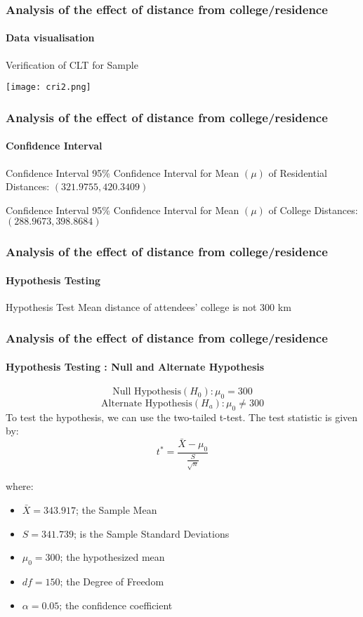 \documentclass{beamer}
\begin{document}
\begin{frame}
\frametitle{Analysis of the effect of distance
from college/residence}
\framesubtitle{Data visualisation}
Verification of CLT for Sample\\
\vspace{5mm}
\begin{minipage}{\textwidth}
    \centering
    \texttt{[image: cri2.png]}
    \label{fig:enter-label}
\end{minipage}
\end{frame}

\begin{frame}
\frametitle{Analysis of the effect of distance
from college/residence}
\framesubtitle{Confidence Interval}
\begin{block}{Confidence Interval}
95\% Confidence Interval for Mean $(\mu)$ of Residential Distances: $(321.9755, 420.3409)$
\end{block}
\begin{block}{Confidence Interval}
95\% Confidence Interval for Mean $(\mu)$ of College Distances: $(288.9673, 398.8684)$
\end{block}
\end{frame}

\begin{frame}
\frametitle{Analysis of the effect of distance
from college/residence}
\framesubtitle{Hypothesis Testing}
\begin{block}{Hypothesis Test}
Mean distance of attendees’ college is not $300$ km
\end{block}
\end{frame}

\begin{frame}
\frametitle{Analysis of the effect of distance
from college/residence}
\framesubtitle{Hypothesis Testing : Null and Alternate Hypothesis}
$$\text{Null Hypothesis}(H_0): \mu_0 = 300 $$
$$\text{Alternate Hypothesis}(H_a): \mu_0 \neq 300$$  
To test the hypothesis, we can use the two-tailed t-test. The test statistic is given by:
\[ t^* = \frac{\bar{X} - \mu_0}{\frac{S}{\sqrt{n}}} \]

where:
\begin{itemize}
    \item $\bar{X} = 343.917$; the Sample Mean 
    \item $S = 341.739$; is the Sample Standard Deviations
    \item $\mu_0 = 300$; the hypothesized mean 
    \item $df = 150$; the Degree of Freedom
    \item $\alpha = 0.05$; the confidence coefficient
\end{itemize}
\end{frame}
\end{document}
